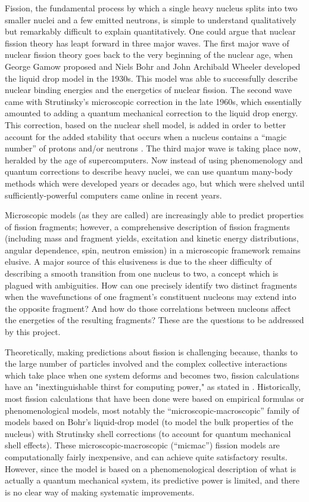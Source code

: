 Fission, the fundamental process by which a single heavy nucleus splits into two smaller nuclei and a few emitted neutrons, is simple to understand qualitatively but remarkably difficult to explain quantitatively. One could argue that nuclear fission theory has leapt forward in three major waves. The first major wave of nuclear fission theory goes back to the very beginning of the nuclear age, when George Gamow proposed and Niels Bohr and John Archibald Wheeler developed the liquid drop model in the 1930s. This model was able to successfully describe nuclear binding energies and the energetics of nuclear fission. The second wave came with Strutinsky’s microscopic correction in the late 1960s, which essentially amounted to adding a quantum mechanical correction to the liquid drop energy. This correction, based on the nuclear shell model, is added in order to better account for the added stability that occurs when a nucleus contains a ``magic number'' of protons and/or neutrons \cite{Strutinsky1967, Strutinsky1968, Brack1972}. The third major wave is taking place now, heralded by the age of supercomputers. Now instead of using phenomenology and quantum corrections to describe heavy nuclei, we can use quantum many-body methods which were developed years or decades ago, but which were shelved until sufficiently-powerful computers came online in recent years.

Microscopic models (as they are called) are increasingly able to predict properties of fission fragments; however, a comprehensive description of fission fragments (including mass and fragment yields, excitation and kinetic energy distributions, angular dependence, spin, neutron emission) in a microscopic framework remains elusive. A major source of this elusiveness is due to the sheer difficulty of describing a smooth transition from one nucleus to two, a concept which is plagued with ambiguities. How can one precisely identify two distinct fragments when the wavefunctions of one fragment’s constituent nucleons may extend into the opposite fragment? And how do those correlations between nucleons affect the energeties of the resulting fragments? These are the questions to be addressed by this project.

Theoretically, making predictions about fission is challenging because, thanks to the large number of particles involved and the complex collective interactions which take place when one system deforms and becomes two, fission calculations have an "inextinguishable thirst for computing power," as stated in \cite{Schunck2016}. Historically, most fission calculations that have been done were based on empirical formulas or phenomenological models, most notably the ``microscopic-macroscopic'' family of models based on Bohr's liquid-drop model (to model the bulk properties of the nucleus) with Strutinsky shell corrections (to account for quantum mechanical shell effects). These microscopic-macroscopic (``micmac'') fission models are computationally fairly inexpensive, and can achieve quite satisfactory results. However, since the model is based on a phenomenological description of what is actually a quantum mechanical system, its predictive power is limited, and there is no clear way of making systematic improvements.

